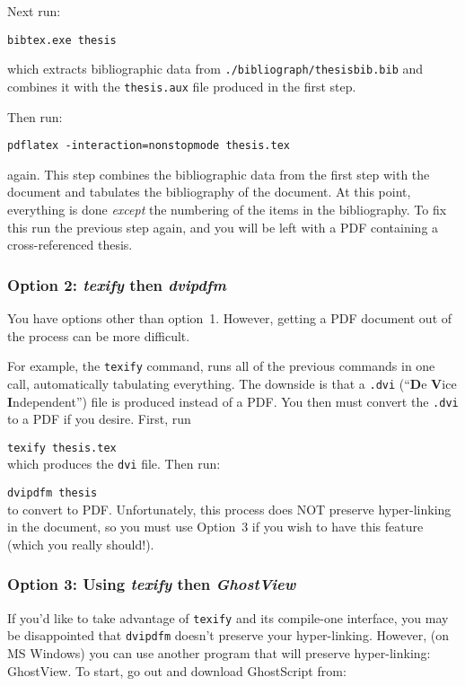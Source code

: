 Next run: 

\verb|bibtex.exe thesis|

\noindent which extracts bibliographic data from 
\verb|./bibliograph/thesisbib.bib| and combines it with
the \verb|thesis.aux| file produced in the first step.

Then run:

\verb|pdflatex -interaction=nonstopmode thesis.tex|

\noindent again. This step combines the bibliographic data
from the first step with the document and tabulates the 
bibliography of the document.  At this point, everything
is done \emph{except} the numbering of the items in the
bibliography.  To fix this run the previous step again, and
you will be left with a PDF containing a cross-referenced
thesis.

\subsubsection{Option 2: \emph{texify} then \emph{dvipdfm}}

You have options other than option~1.  However, getting a 
PDF document out of the process can be more difficult. 

For example, the \verb|texify| command, runs all of the previous
commands in one call, automatically tabulating everything.  The
downside is that a \verb|.dvi| (``\textbf{D}e \textbf{V}ice
\textbf{I}ndependent'') file is produced instead of a PDF\null.  You then
must convert the \verb|.dvi| to a PDF if you desire.  First, run

\verb|texify thesis.tex|
\\
which produces the \verb|dvi| file.  Then run:

\verb|dvipdfm thesis|
\\
to convert to PDF\null. Unfortunately, this process
does NOT preserve hyper-linking in the document, so you 
must use Option~3 if you wish to have this feature (which you
really should!).

\subsubsection{Option 3: Using \emph{texify} then \emph{GhostView}}

If you'd like to take advantage of \verb|texify| and its compile-one
interface, you may be disappointed that \verb|dvipdfm| doesn't
preserve your hyper-linking.  However, (on MS Windows) you can use
another program that will preserve hyper-linking: GhostView.
To start, go out and download GhostScript from:

